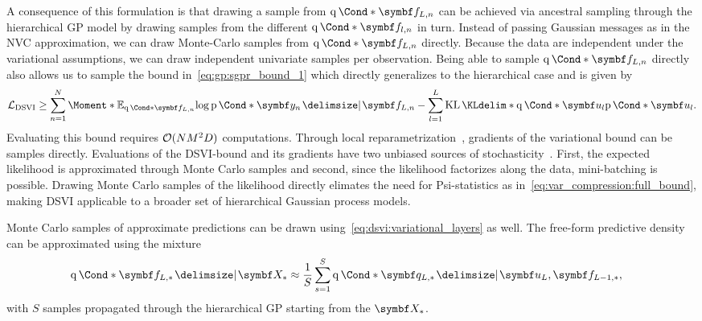 A consequence of this formulation is that drawing a sample from $\Variat*{\mat{f}_{L,n}}$ can be achieved via ancestral sampling through the hierarchical GP model by drawing samples from the different $\Variat*{\mat{f}_{l, n}}$ in turn.
Instead of passing Gaussian messages as in the NVC approximation, we can draw Monte-Carlo samples from $\Variat*{\mat{f}_{L, n}}$ directly.
Because the data are independent under the variational assumptions, we can draw independent univariate samples per observation.
Being able to sample $\Variat*{\mat{f}_{L, n}}$ directly also allows us to sample the bound in~\cref{eq:gp:sgpr_bound_1} which directly generalizes to the hierarchical case and is given by
\begin{equation}
    \begin{split}
        \label{eq:dsvi:full_bound}
        \Lc_{\text{DSVI}} \geq
        \sum_{n=1}^N \Moment*{\E_{\Variat*{\mat{f}_{L, n}}}}{\log \Prob*{\mat{y}_n \given \mat{f}_{L, n}}}
        - \sum_{l=1}^L \KL*{\Variat*{\mat{u}_l}}{\Prob*{\mat{u}_l}}.
    \end{split}
\end{equation}
Evaluating this bound requires $\operatorname{\mathcal{O}}(NM^2D)$ computations.
Through local reparametrization~\parencite{kingma_variational_2015}, gradients of the variational bound can be samples directly.
Evaluations of the DSVI-bound and its gradients have two unbiased sources of stochasticity~\parencite{salimbeni_doubly_2017}.
First, the expected likelihood is approximated through Monte Carlo samples and second, since the likelihood factorizes along the data, mini-batching is possible.
Drawing Monte Carlo samples of the likelihood directly elimates the need for Psi-statistics as in~\cref{eq:var_compression:full_bound}, making DSVI applicable to a broader set of hierarchical Gaussian process models.

Monte Carlo samples of approximate predictions can be drawn using~\cref{eq:dsvi:variational_layers} as well.
The free-form predictive density can be approximated using the mixture
\begin{equation}
    \begin{split}
        \label{eq:dsvi:approximate_predictions}
        \Variat*{\mat{f}_{L, \ast} \given \mat{X}_{\ast}}
        &\approx \frac{1}{S} \sum_{s=1}^S \Variat*{\mat{q}_{L, \ast} \given \mat{u}_L, \mat{f}_{L-1, \ast}},
    \end{split}
\end{equation}
with $S$ samples propagated through the hierarchical GP starting from the $\mat{X}_{\ast}$.
